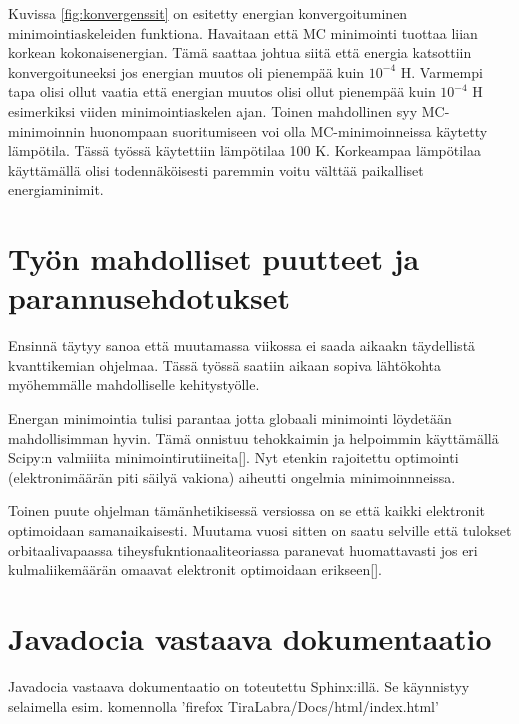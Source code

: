 \documentclass{article}
\begin{document}
Kuvissa \ref{fig:konvergenssit} on esitetty energian konvergoituminen
minimointiaskeleiden funktiona. Havaitaan että MC minimointi tuottaa
liian korkean kokonaisenergian. Tämä saattaa johtua siitä että energia
katsottiin konvergoituneeksi jos energian muutos oli pienempää kuin
$10^{-4}$ H. Varmempi tapa olisi ollut vaatia että energian muutos
olisi ollut pienempää kuin $10^{-4}$ H esimerkiksi viiden
minimointiaskelen ajan. Toinen mahdollinen syy MC-minimoinnin
huonompaan suoritumiseen voi olla MC-minimoinneissa käytetty
lämpötila. Tässä työssä käytettiin lämpötilaa 100 K. Korkeampaa
lämpötilaa käyttämällä olisi todennäköisesti paremmin voitu välttää
paikalliset energiaminimit.

\section{Työn mahdolliset puutteet ja parannusehdotukset}
Ensinnä täytyy sanoa että muutamassa viikossa ei saada aikaakn
täydellistä kvanttikemian ohjelmaa. Tässä työssä saatiin aikaan sopiva
lähtökohta myöhemmälle mahdolliselle kehitystyölle.

Energan minimointia tulisi parantaa jotta globaali minimointi
löydetään mahdollisimman hyvin. Tämä onnistuu tehokkaimin ja
helpoimmin käyttämällä Scipy:n valmiiita
minimointirutiineita[\cite{jones2001scipy}]. Nyt etenkin rajoitettu
optimointi (elektronimäärän piti säilyä vakiona) aiheutti ongelmia
minimoinnneissa.

Toinen puute ohjelman tämänhetikisessä versiossa on se että kaikki
elektronit optimoidaan samanaikaisesti. Muutama vuosi sitten on saatu
selville että tulokset orbitaalivapaassa tiheysfukntionaaliteoriassa
paranevat huomattavasti jos eri kulmaliikemäärän omaavat elektronit
optimoidaan erikseen[\cite{ke2013angular}].

\section{Javadocia vastaava dokumentaatio}
Javadocia vastaava dokumentaatio on toteutettu Sphinx:illä.  Se
käynnistyy selaimella esim. komennolla 'firefox
TiraLabra/Docs/html/index.html'






\end{document}
